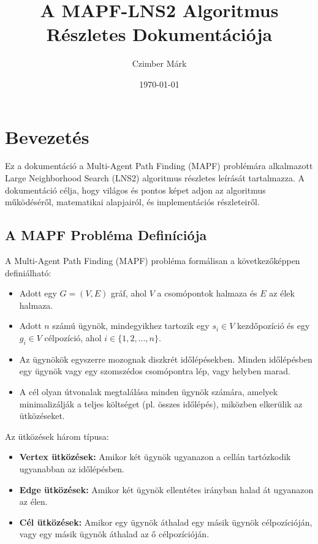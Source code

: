 \documentclass[a4paper,12pt]{article}
\title{A MAPF-LNS2 Algoritmus Részletes Dokumentációja}
\author{Czimber Márk}
\date{\today}
\begin{document}
\maketitle

\tableofcontents
\newpage

\section{Bevezetés}

Ez a dokumentáció a Multi-Agent Path Finding (MAPF) problémára alkalmazott Large Neighborhood Search (LNS2) algoritmus részletes leírását tartalmazza. A dokumentáció célja, hogy világos és pontos képet adjon az algoritmus működéséről, matematikai alapjairól, és implementációs részleteiről.

\subsection{A MAPF Probléma Definíciója}

A Multi-Agent Path Finding (MAPF) probléma formálisan a következőképpen definiálható:

\begin{itemize}
    \item Adott egy $G = (V, E)$ gráf, ahol $V$ a csomópontok halmaza és $E$ az élek halmaza.
    \item Adott $n$ számú ügynök, mindegyikhez tartozik egy $s_i \in V$ kezdőpozíció és egy $g_i \in V$ célpozíció, ahol $i \in \{1, 2, ..., n\}$.
    \item Az ügynökök egyszerre mozognak diszkrét időlépésekben. Minden időlépésben egy ügynök vagy egy szomszédos csomópontra lép, vagy helyben marad.
    \item A cél olyan útvonalak megtalálása minden ügynök számára, amelyek minimalizálják a teljes költséget (pl. összes időlépés), miközben elkerülik az ütközéseket.
\end{itemize}

Az ütközések három típusa:
\begin{itemize}
    \item \textbf{Vertex ütközések:} Amikor két ügynök ugyanazon a cellán tartózkodik ugyanabban az időlépésben.
    \item \textbf{Edge ütközések:} Amikor két ügynök ellentétes irányban halad át ugyanazon az élen.
    \item \textbf{Cél ütközések:} Amikor egy ügynök áthalad egy másik ügynök célpozícióján, vagy egy másik ügynök áthalad az ő célpozícióján.
\end{itemize}
\end{document}
